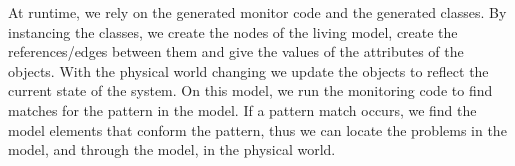 At runtime, we rely on the generated monitor code and the generated classes. By instancing the classes, we create the nodes of the living model, create the references/edges between them and give the values of the attributes of the objects. With the physical world changing we update the objects to reflect the current state of the system. On this model, we run the monitoring code to find matches for the pattern in the model. If a pattern match occurs, we find the model elements that conform the pattern, thus we can locate the problems in the model, and through the model, in the physical world. 

